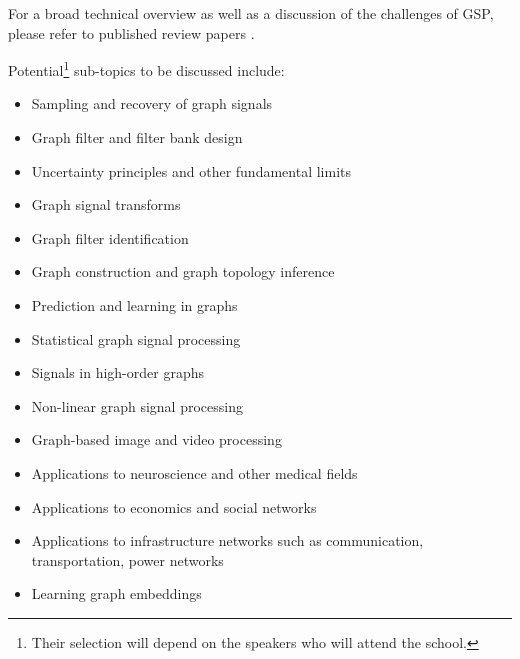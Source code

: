 \documentclass[a4paper]{scrartcl}
\newcommand{\nati}[1]{{\color[rgb]{.1,.6,.1}{#1}}}
\begin{document}
For a broad technical overview as well as a discussion of the challenges of GSP,
please refer to published review papers \cite{shuman_emerging_2013,
sandryhaila_discrete_2014, coifman_diffusion_2006, ekambaram_circulant_2013}.

Potential\footnote{Their selection will depend on the speakers who will attend
the school.} sub-topics to be discussed include:
\begin{itemize}
	\setlength{\itemsep}{0pt} \setlength{\parskip}{0pt}
	\item Sampling and recovery of graph signals \cite{puy2015random,tsitsvero2015signals,anis2014towards}
	\item Graph filter and filter bank design \cite{hammond2011wavelets,narang_bior_filters,ekambaram_globalsip,leonardi_multislice,leonardi_fmri,shuman2013spectrum}
	\item Uncertainty principles and other fundamental limits \cite{perraudin2016global,agaskar_spie,pasdeloup}
	\item Graph signal transforms \cite{szlam,gavish,Maggioni_biorthogonal,coifman_diffusion_2006,lafon_coarse,narang_lifting_graphs}
	\item Graph filter identification \cite{thanou_TSP_2014}
	\item Graph construction and graph topology inference \cite{kalofolias2016learn,Dong:2014tj}
	\item Prediction and learning in graphs \nati{??????}
	\item Statistical graph signal processing \cite{perraudin2016stationary,zhang2015graph,gadde2015probabilistic}
	\item Signals in high-order graphs \nati{??????}
	\item Non-linear graph signal processing \nati{??????}
	\item Graph-based image and video processing \cite{elmoataz2008nonlocal,lezoray2008nonlocal,shahid2015fast}
	\item Applications to neuroscience and other medical fields \cite{huang2015graph,hu2015spectral}
	\item Applications to economics and social networks \nati{I do not have any references for this one.}
	\item Applications to infrastructure networks such as communication, transportation, power networks \cite{mcgraw,jain2014big,borgnat2011shared}
	\item Learning graph embeddings \cite{von2008consistency,zhou2006learning,belkin2003laplacian}

\end{itemize}
\end{document}
